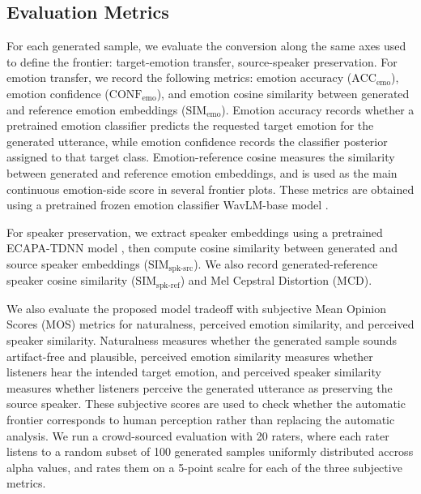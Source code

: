 \subsection{Evaluation Metrics}
For each generated sample, we evaluate the conversion along the same axes used to define the frontier: target-emotion transfer, source-speaker preservation. For emotion transfer, we record the following metrics: emotion accuracy ($\text{ACC}_\text{emo}$), emotion confidence ($\text{CONF}_\text{emo}$), and emotion cosine similarity between generated and reference emotion embeddings ($\text{SIM}_\text{emo}$). Emotion accuracy records whether a pretrained emotion classifier predicts the requested target emotion for the generated utterance, while emotion confidence records the classifier posterior assigned to that target class.
Emotion-reference cosine measures the similarity between generated and reference emotion embeddings, and is used as the main continuous emotion-side score in several frontier plots. These metrics are obtained using a pretrained frozen emotion classifier WavLM-base model \cite{chen2022wavlm}.

For speaker preservation, we extract speaker embeddings using a pretrained ECAPA-TDNN model \cite{desplanques2020ecapatdnn}, then compute cosine similarity between generated  and source speaker embeddings ($\text{SIM}_\text{spk-src}$). We also record generated-reference speaker cosine similarity ($\text{SIM}_\text{spk-ref}$) and Mel Cepstral Distortion (MCD).

We also evaluate the proposed model tradeoff with subjective Mean Opinion Scores (MOS) metrics for naturalness, perceived emotion similarity, and perceived speaker similarity.
Naturalness measures whether the generated sample sounds artifact-free and plausible, perceived emotion similarity measures whether listeners hear the intended target emotion, and perceived speaker similarity measures whether listeners perceive the generated utterance as preserving the source speaker.
These subjective scores are used to check whether the automatic frontier corresponds to human perception rather than replacing the automatic analysis.
We run a crowd-sourced evaluation with 20 raters, where each rater listens to a random subset of 100 generated samples uniformly distributed accross alpha values, and rates them on a 5-point scalre for each of the three subjective metrics.

